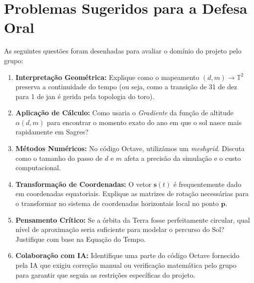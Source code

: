 \documentclass[12pt,a4paper]{report}
\begin{document}
\chapter{Problemas Sugeridos para a Defesa Oral}

As seguintes questões foram desenhadas para avaliar o domínio do projeto pelo grupo:

\begin{enumerate}
    \item \textbf{Interpretação Geométrica:} Explique como o mapeamento $(d, m) \to \mathbb{T}^2$ preserva a continuidade do tempo (ou seja, como a transição de 31 de dez para 1 de jan é gerida pela topologia do toro).
    \item \textbf{Aplicação de Cálculo:} Como usaria o \textit{Gradiente} da função de altitude $\alpha(d, m)$ para encontrar o momento exato do ano em que o sol nasce mais rapidamente em Sagres?
    \item \textbf{Métodos Numéricos:} No código Octave, utilizámos um \textit{meshgrid}. Discuta como o tamanho do passo de $d$ e $m$ afeta a precisão da simulação e o custo computacional.
    \item \textbf{Transformação de Coordenadas:} O vetor $\mathbf{s}(t)$ é frequentemente dado em coordenadas equatoriais. Explique as matrizes de rotação necessárias para o transformar no sistema de coordenadas horizontais local no ponto $\mathbf{p}$.
    \item \textbf{Pensamento Crítico:} Se a órbita da Terra fosse perfeitamente circular, qual nível de aproximação seria suficiente para modelar o percurso do Sol? Justifique com base na Equação do Tempo.
    \item \textbf{Colaboração com IA:} Identifique uma parte do código Octave fornecido pela IA que exigiu correção manual ou verificação matemática pelo grupo para garantir que seguia as restrições específicas do projeto.
\end{enumerate}
\end{document}
